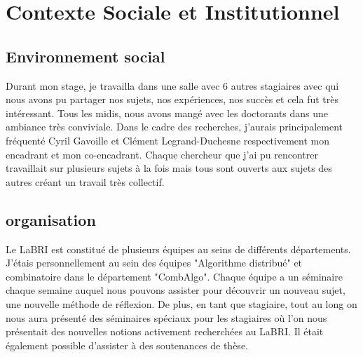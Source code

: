 \section{Contexte Sociale et Institutionnel}

\subsection{Environnement social}

Durant mon stage, je travailla dans une salle avec 6 autres stagiaires avec qui nous avons pu partager nos sujets, nos expériences, nos succès et cela fut très intéressant. Tous les midis, nous avons mangé avec les doctorants dans une ambiance très conviviale. 
Dans le cadre des recherches, j'aurais principalement fréquenté Cyril Gavoille et Clément Legrand-Duchesne respectivement mon encadrant et mon co-encadrant. Chaque chercheur que j'ai pu rencontrer travaillait sur plusieurs sujets à la fois mais tous sont ouverts aux sujets des autres créant un travail très collectif.

\subsection{organisation} Le LaBRI est constitué de plusieurs équipes au seins de différents départements. J'étais personnellement au sein des équipes "Algorithme distribué" et combinatoire dans le département "CombAlgo". Chaque équipe a un séminaire chaque semaine auquel nous pouvons assister pour découvrir un nouveau sujet, une nouvelle méthode de réflexion. De plus, en tant que stagiaire, tout au long on nous aura présenté des séminaires spéciaux pour les stagiaires où l'on nous présentait des nouvelles notions activement recherchées au LaBRI. Il était également possible d'assister à des soutenances de thèse.